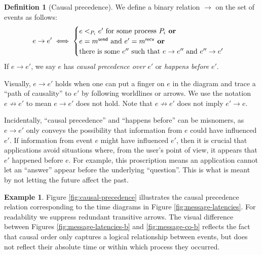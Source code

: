 \documentclass[]             %
{NASA}                       %
\theoremstyle{definition}
\newtheorem{example}[theorem]{Example}
\newtheorem{definition}[theorem]{Definition}
\begin{document}
\begin{definition}[Causal precedence]
  \label{def:causalprecedence}
  We define a binary relation $\to$ on the set of events as follows:
  \[e \to e' \iff
  \begin{cases}
    e <_{P_i} e' \textrm{ for some process $P_i$}
    \textbf{ or} \\
    e = m_{}^{\mathsf{send}} \textrm{ and } e' =m_{}^{\mathsf{recv}}
    \textbf{ or} \\
    \textrm{there is some } e'' \textrm{ such that } e \to e'' \textrm{ and } e'' \to e'
  \end{cases}
  \]
  If $e \to e'$, we say $e$ has \emph{causal precedence over} $e'$ or
  \emph{happens before} $e'$.
\end{definition}
Visually, $e \to e'$ holds when one can put a finger on $e$ in the
diagram and trace a ``path of causality'' to $e'$ by following
worldlines or arrows. We use the notation $e \not \to e'$ to mean
$e \to e'$ does not hold. Note that $e \not \to e'$ does not imply
$e' \to e$.

Incidentally, ``causal precedence'' and ``happens before'' can be
misnomers, as $e \to e'$ only conveys the possibility that information
from $e$ could have influenced $e'$. If information from event $e$
might have influenced $e'$, then it is crucial that applications avoid
situations where, from the user's point of view, it appears that $e'$
happened before $e$. For example, this proscription means an
application cannot let an ``answer'' appear before the underlying
``question''. This is what is meant by not letting the future affect
the past.

\begin{example}
  Figure \ref{fig:causal-precedence} illustrates the causal precedence
  relation corresponding to the time diagrams in Figure
  \ref{fig:message-latencies}. For readability we suppress redundant
  transitive arrows. The visual difference between Figures
  \ref{fig:message-latencies-b} and \ref{fig:message-co-b} reflects
  the fact that causal order only captures a logical relationship
  between events, but does not reflect their absolute time or within
  which process they occurred.
\end{example}
\end{document}
